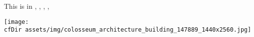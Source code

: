 This is in \textbf{\currfilename},
\textbf{\currfiledir},
\textbf{\currfilepath},
\textbf{\currfileabsdir},
\textbf{\currfileabspath}
\par

\texttt{[image: \\cfDir assets/img/colosseum\_architecture\_building\_147889\_1440x2560.jpg]}
\par
